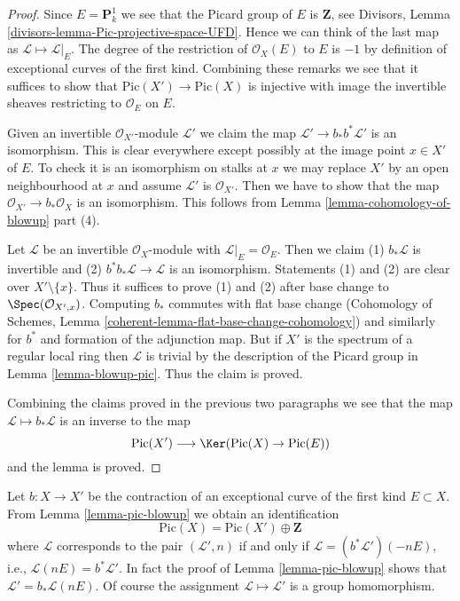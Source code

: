 \begin{proof}
Since $E = \mathbf{P}^1_k$ we see that the Picard group of $E$
is $\mathbf{Z}$, see Divisors, Lemma
\ref{divisors-lemma-Pic-projective-space-UFD}.
Hence we can think of the last map as $\mathcal{L} \mapsto \mathcal{L}|_E$.
The degree of the restriction of $\mathcal{O}_X(E)$ to $E$ is $-1$
by definition of exceptional curves of the first kind. Combining these
remarks we see that it
suffices to show that $\text{Pic}(X') \to \text{Pic}(X)$ is injective
with image the invertible sheaves restricting to $\mathcal{O}_E$ on $E$.

\medskip\noindent
Given an invertible $\mathcal{O}_{X'}$-module
$\mathcal{L}'$ we claim the map $\mathcal{L}' \to b_*b^*\mathcal{L}'$
is an isomorphism. This is clear everywhere except possibly at the image
point $x \in X'$ of $E$. To check it is an isomorphism on stalks
at $x$ we may replace $X'$ by an open neighbourhood at $x$ and
assume $\mathcal{L}'$ is $\mathcal{O}_{X'}$. Then we have to
show that the map $\mathcal{O}_{X'} \to b_*\mathcal{O}_X$
is an isomorphism. This follows from Lemma \ref{lemma-cohomology-of-blowup}
part (4).

\medskip\noindent
Let $\mathcal{L}$ be an invertible $\mathcal{O}_X$-module with
$\mathcal{L}|_E = \mathcal{O}_E$. Then we claim 
(1) $b_*\mathcal{L}$ is invertible and
(2) $b^*b_*\mathcal{L} \to \mathcal{L}$ is an isomorphism.
Statements (1) and (2) are clear over $X' \setminus \{x\}$.
Thus it suffices to prove (1) and (2) after base change
to $\Spec(\mathcal{O}_{X', x})$.
Computing $b_*$ commutes with flat base change
(Cohomology of Schemes, Lemma \ref{coherent-lemma-flat-base-change-cohomology})
and similarly for $b^*$ and formation of the adjunction map.
But if $X'$ is the spectrum of a regular local ring
then $\mathcal{L}$ is trivial by the description of
the Picard group in Lemma \ref{lemma-blowup-pic}. Thus
the claim is proved.

\medskip\noindent
Combining the claims proved in the previous two paragraphs we
see that the map $\mathcal{L} \mapsto b_*\mathcal{L}$
is an inverse to the map
$$
\text{Pic}(X') \longrightarrow \Ker(\text{Pic}(X) \to \text{Pic}(E))
$$
and the lemma is proved.
\end{proof}

\begin{remark}
\label{remark-pic-blowup}
Let $b : X \to X'$ be the contraction of an
exceptional curve of the first kind $E \subset X$.
From Lemma \ref{lemma-pic-blowup} we obtain an identification
$$
\text{Pic}(X) = \text{Pic}(X') \oplus \mathbf{Z}
$$
where $\mathcal{L}$ corresponds to the pair $(\mathcal{L}', n)$ if and only if
$\mathcal{L} = (b^*\mathcal{L}')(-nE)$, i.e.,
$\mathcal{L}(nE) = b^*\mathcal{L}'$. In fact the proof of
Lemma \ref{lemma-pic-blowup} shows that $\mathcal{L}' = b_*\mathcal{L}(nE)$.
Of course the assignment $\mathcal{L} \mapsto \mathcal{L}'$ is
a group homomorphism.
\end{remark}

